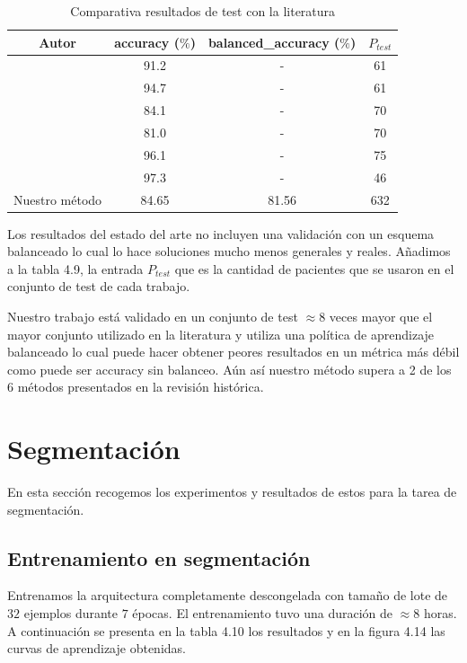 \begin{table}[H]
	\centering
	\begin{tabular}{|cccc|}
		\toprule
		Autor & accuracy ($\%$) & balanced\_accuracy ($\%$) & $P_{test}$ \\
		\midrule
		\cite{cheng2015enhanced} & 91.2 & - & 61\\ 
		\cite{cheng2016retrieval} & 94.7 & - & 61\\ 
		\cite{abiwinanda2019brain} & 84.1 & - & 70\\ 
		\cite{pashaei2018brain} & 81.0 & - & 70\\ 
		\cite{sultan2019multi} & 96.1 & - & 75\\
		\cite{diaz2021deep} & 97.3 & - & 46 \\  
		Nuestro método & 84.65 & 81.56 & 632 \\ 
		\bottomrule
	\end{tabular}
	\caption{Comparativa resultados de test con la literatura}
	\label{tabla:resultados12}
\end{table}

Los resultados del estado del arte no incluyen una validación con un esquema balanceado lo cual lo hace soluciones mucho menos generales y reales. Añadimos a la tabla 4.9, la entrada $P_{test}$ que es la cantidad de pacientes que se usaron en el conjunto de test de cada trabajo.

Nuestro trabajo está validado en un conjunto de test $\approx 8$ veces mayor que el mayor conjunto utilizado en la literatura y utiliza una política de aprendizaje balanceado lo cual puede hacer obtener peores resultados en un métrica más débil como puede ser accuracy sin balanceo. Aún así nuestro método supera a 2 de los 6 métodos presentados en la revisión histórica.

\section{Segmentación}

En esta sección recogemos los experimentos y resultados de estos para la tarea de segmentación. 

\subsection{Entrenamiento en segmentación}
Entrenamos la arquitectura completamente descongelada con tamaño de lote de $32$ ejemplos durante $7$ épocas. El entrenamiento tuvo una duración de $ \approx 8$ horas. A continuación se presenta en la tabla 4.10 los resultados y en la figura 4.14 las curvas de aprendizaje obtenidas.

